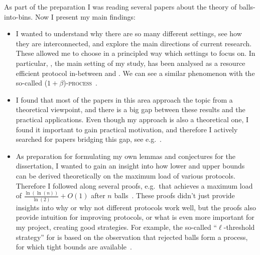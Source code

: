 
As part of the preparation I was reading several papers about the theory of balls-into-bins. Now I present my main findings: 


\begin{itemize}
    \item 
    I wanted to understand why there are so many different settings, see how they are interconnected, and explore the main directions of current research. These allowed me to choose in a principled way which settings to focus on. In particular, \TwoThinning, the main setting of my study, has been analysed as a resource efficient protocol in-between \OneChoice and \TwoChoice. We can see a similar phenomenon with the so-called \textsc{($1+\beta$)-process}~\cite{peres2015oneplusbeta}.
    \item
    I found that most of the papers in this area approach the topic from a theoretical viewpoint, and there is a big gap between these results and the practical applications. Even though my approach is also a theoretical one, I found it important to gain practical motivation, and therefore I actively searched for papers bridging this gap, see e.g.~\cite{wang2017twochoicerouting}.
    \item
    As preparation for formulating my own lemmas and conjectures for the dissertation, I wanted to gain an insight into how lower and upper bounds can be derived theoretically on the maximum load of various protocols. Therefore I followed along several proofs, e.g.\ that \TwoChoice achieves a maximum load of $\frac{\ln(\ln(n))}{\ln(2)} + O(1)$ after $n$ balls~\cite{azar1999twochoice}. These proofs didn't just provide insights into why or why not different protocols work well, but the proofs also provide intuition for improving protocols, or what is even more important for my project, creating good strategies. For example, the so-called ``{$\ell$}-threshold strategy'' for \TwoThinning is based on the observation that rejected balls form a \OneChoice process, for which tight bounds are available~\cite{feldheim2021thinning}.

\end{itemize}
